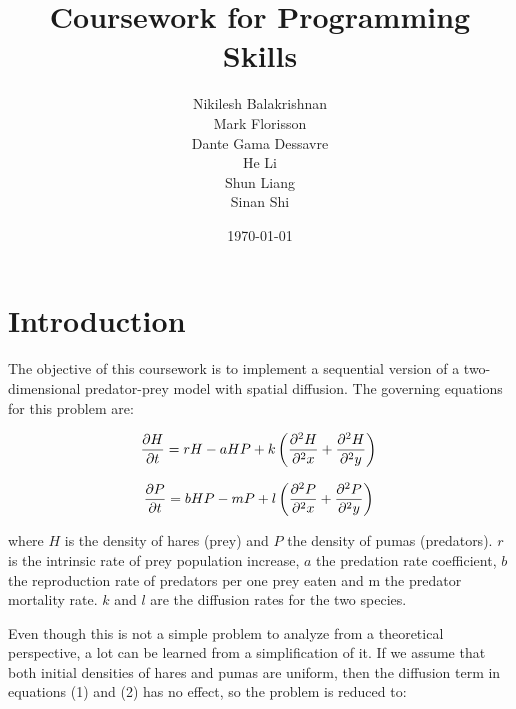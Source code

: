 \documentclass[12pt,a4paper]{article}
\begin{document}
\title{Coursework for Programming Skills}
\author{Nikilesh Balakrishnan\\
        Mark Florisson\\
        Dante Gama Dessavre\\
        He Li\\
        Shun Liang\\
        Sinan Shi}
\date{\today}

\makeEPCCtitle

\thispagestyle{empty}

\newpage


\tableofcontents

\newpage


\section{Introduction}

The objective of this coursework is to implement a sequential version of a two-dimensional predator-prey model with spatial diffusion. The governing equations for this problem are:

\begin{equation}
\frac{\partial H}{\partial t}=rH-aHP+k\left(\frac{\partial^2 H}{\partial^2 x}+\frac{\partial^2 H}{\partial^2 y}\right)\\
\end{equation}

\begin{equation}
\frac{\partial P}{\partial t}=bHP-mP+l\left(\frac{\partial^2 P}{\partial^2 x}+\frac{\partial^2 P}{\partial^2 y}\right)\\
\end{equation}

where $H$ is the density of hares (prey) and $P$ the density of pumas (predators). $r$ is the intrinsic rate of prey population increase, $a$ the predation rate coefficient, $b$ the reproduction rate of predators per one prey eaten and m the predator mortality rate. $k$ and $l$ are the diffusion rates for the two species.

Even though this is not a simple problem to analyze from a theoretical perspective, a lot can be learned from a simplification of it. If we assume that both initial densities of hares and pumas are uniform, then the diffusion term in equations (1) and (2) has no effect, so the problem is reduced to:
\end{document}
